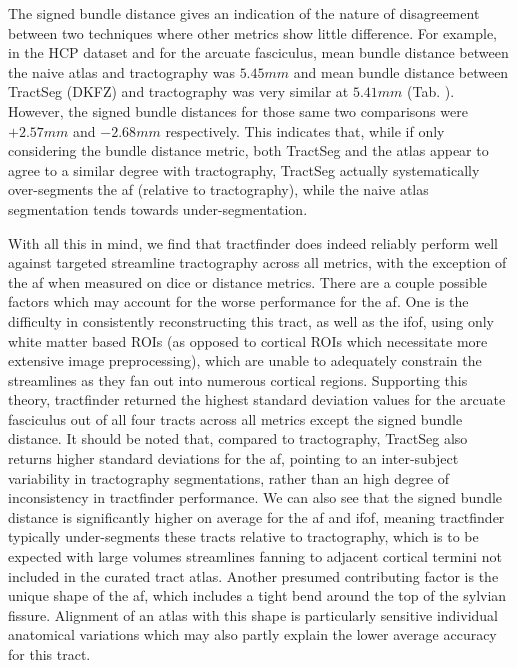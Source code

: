 The signed bundle distance gives an indication of the nature of disagreement between two techniques where other metrics show little difference.
For example, in the HCP dataset and for the arcuate fasciculus, mean bundle distance between the naive atlas and tractography was $5.45 mm$ and mean bundle distance between TractSeg (DKFZ) and tractography was very similar at $5.41 mm$ (Tab. ).
However, the signed bundle distances for those same two comparisons were $+2.57 mm$ and $-2.68 mm$ respectively.
This indicates that, while if only considering the bundle distance metric, both TractSeg and the atlas appear to agree to a similar degree with tractography, TractSeg actually systematically over-segments the \gls{af} (relative to tractography), while the naive atlas segmentation tends towards under-segmentation.

With all this in mind, we find that tractfinder does indeed reliably perform well against targeted streamline tractography across all metrics, with the exception of the \gls{af} when measured on \gls{dice} or distance metrics.
There are a couple possible factors which may account for the worse performance for the \gls{af}.
One is the difficulty in consistently reconstructing this tract, as well as the \gls{ifof}, using only white matter based ROIs (as opposed to cortical ROIs which necessitate more extensive image preprocessing), which are unable to adequately constrain the streamlines as they fan out into numerous cortical regions.
Supporting this theory, tractfinder returned the highest standard deviation values for the arcuate fasciculus out of all four tracts across all metrics except the signed bundle distance.
It should be noted that, compared to tractography, TractSeg also returns higher standard deviations for the \gls{af}, pointing to an inter-subject variability in tractography segmentations, rather than an high degree of inconsistency in tractfinder performance.
We can also see that the signed bundle distance is significantly higher on average for the \gls{af} and \gls{ifof}, meaning tractfinder typically under-segments these tracts relative to tractography, which is to be expected with large volumes streamlines fanning to adjacent cortical termini not included in the curated tract atlas.
Another presumed contributing factor is the unique shape of the \gls{af}, which includes a tight bend around the top of the sylvian fissure.
Alignment of an atlas with this shape is particularly sensitive individual anatomical variations which may also partly explain the lower average accuracy for this tract.

